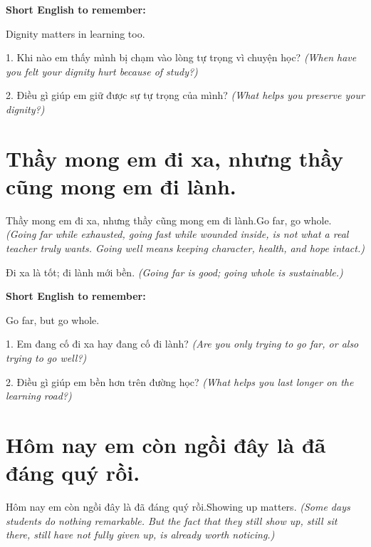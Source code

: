\begin{ghinhoanh}
\textbf{Short English to remember:}

Dignity matters in learning too.

\end{ghinhoanh}

\begin{tuhocnhanh}
1. Khi nào em thấy mình bị chạm vào lòng tự trọng vì chuyện học? \textit{(When have you felt your dignity hurt because of study?)}

2. Điều gì giúp em giữ được sự tự trọng của mình? \textit{(What helps you preserve your dignity?)}
\end{tuhocnhanh}
\ngancach


\section{Thầy mong em đi xa, nhưng thầy cũng mong em đi lành.}
\begin{truyen}{Thầy mong em đi xa, nhưng thầy cũng mong em đi lành.}{Go far, go whole.}
\textit{(Going far while exhausted, going fast while wounded inside, is not what a real teacher truly wants. Going well means keeping character, health, and hope intact.)}
\end{truyen}

\begin{baihoc}
Đi xa là tốt; đi lành mới bền.
\textit{(Going far is good; going whole is sustainable.)}
\end{baihoc}

\begin{ghinhoanh}
\textbf{Short English to remember:}

Go far, but go whole.

\end{ghinhoanh}

\begin{tuhocnhanh}
1. Em đang cố đi xa hay đang cố đi lành? \textit{(Are you only trying to go far, or also trying to go well?)}

2. Điều gì giúp em bền hơn trên đường học? \textit{(What helps you last longer on the learning road?)}
\end{tuhocnhanh}
\ngancach


\section{Hôm nay em còn ngồi đây là đã đáng quý rồi.}
\begin{truyen}{Hôm nay em còn ngồi đây là đã đáng quý rồi.}{Showing up matters.}
\textit{(Some days students do nothing remarkable. But the fact that they still show up, still sit there, still have not fully given up, is already worth noticing.)}
\end{truyen}

